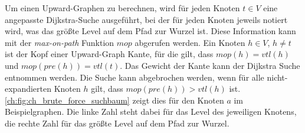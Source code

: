 Um einen Upward-Graphen zu berechnen, wird für jeden Knoten $t \in V$ eine angepasste Dijkstra-Suche ausgeführt, bei der für jeden Knoten jeweils notiert wird, was das größte Level auf dem Pfad zur Wurzel ist.
Diese Information kann mit der \emph{max-on-path} Funktion ${mop}$ abgerufen werden.
Ein Knoten $h \in V$, $h \neq t$ ist der Kopf einer Upward-Graph Kante, für die gilt, dass ${mop}(h) = {vtl}(h)$ und ${mop}({pre}(h)) = {vtl}(t)$.
Das Gewicht der Kante kann der Dijkstra Suche entnommen werden.
Die Suche kann abgebrochen werden, wenn für alle nicht-expandierten Knoten $h$ gilt, dass ${mop}({pre}(h)) > {vtl}(h)$ ist.
\autoref{ch:fig:ch_brute_force_suchbaum} zeigt dies für den Knoten $a$ im Beispielgraphen.
Die linke Zahl steht dabei für das Level des jeweiligen Knotens, die rechte Zahl für das größte Level auf dem Pfad zur Wurzel.

